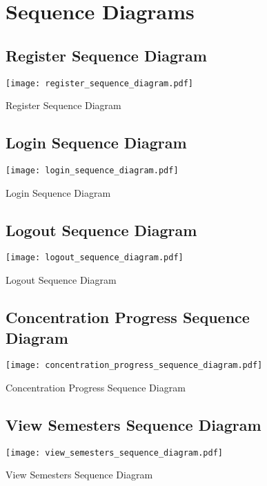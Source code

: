 \documentclass[12pt]{article}
\begin{document}
\clearpage

\begin{figure}[p!]
  \section{Sequence Diagrams}
  \subsection{Register Sequence Diagram}
  \centering
  \texttt{[image: register\_sequence\_diagram.pdf]}
  \caption{Register Sequence Diagram}
\end{figure}

\begin{figure}[p!]
  \subsection{Login Sequence Diagram}
  \centering
  \texttt{[image: login\_sequence\_diagram.pdf]}
  \caption{Login Sequence Diagram}
\end{figure}

\begin{figure}[p!]
  \subsection{Logout Sequence Diagram}
  \centering
  \texttt{[image: logout\_sequence\_diagram.pdf]}
  \caption{Logout Sequence Diagram}
\end{figure}

\begin{figure}[p!]
  \subsection{Concentration Progress Sequence Diagram}
  \centering
  \texttt{[image: concentration\_progress\_sequence\_diagram.pdf]}
  \caption{Concentration Progress Sequence Diagram}
\end{figure}

\begin{figure}[p!]
  \subsection{View Semesters Sequence Diagram}
  \centering
  \texttt{[image: view\_semesters\_sequence\_diagram.pdf]}
  \caption{View Semesters Sequence Diagram}
\end{figure}
\end{document}
